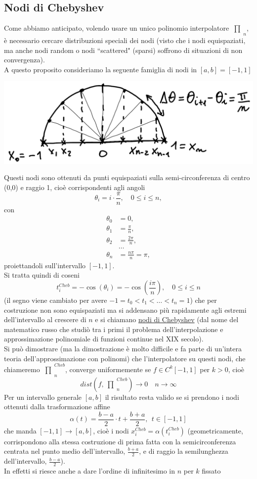\documentclass[12pt]{article}
\newcommand{\inter}{\begin{matrix}\prod\end{matrix}}
\begin{document}
\subsection{Nodi di Chebyshev}
Come abbiamo anticipato, volendo usare un unico polinomio interpolatore $\inter_n$, è necessario cercare distribuzioni speciali dei nodi (visto che i nodi equispaziati, ma anche nodi random o nodi ``scattered" (sparsi) soffrono di situazioni di non convergenza).\\
A questo proposito consideriamo la seguente famiglia di nodi in $[a,b]=[-1,1]$
\begin{center}
    \includegraphics[scale=0.5]{pag-16.png}
\end{center}
Questi nodi sono ottenuti da punti equispaziati sulla semi-circonferenza di centro (0,0) e raggio 1, cioè corrispondenti agli angoli 
\[\theta_i=i\cdot \frac{\pi}{n}, \quad 0\leq i\leq n,\] 
con 
\[\begin{split}
    \theta_0 & = 0, \\
    \theta_1 & = \frac{\pi}{n}, \\
    \theta_2 & = \frac{2\pi}{n}, \\
    & \dotso \\
    \theta_n & = \frac{n\pi}{n}=\pi,
\end{split}\]
 proiettandoli sull'intervallo $[-1,1]$.\\ 
 Si tratta quindi di coseni 
\[ t_i^{Cheb}=-\cos(\theta_i)=-\cos\left(\frac{i\pi}{n}\right),\quad 0\leq i\leq n \]
(il segno viene cambiato per avere $-1=t_0< t_1<\dotso<t_n=1$) che per costruzione non sono equispaziati ma si addensano  più rapidamente agli estremi dell'intervallo al crescere di $n$ e si chiamano \uline{nodi di Chebyshev} (dal nome del matematico russo che studiò tra i primi il problema dell'interpolazione e approssimazione polinomiale di funzioni continue nel XIX secolo).\\ 
Si può dimostrare (ma la dimostrazione è molto difficile e fa parte di un'intera teoria dell'approssimazione con polinomi) che l'interpolatore su questi nodi, che chiameremo $\inter_n^{Cheb}$, converge uniformemente se $f\in C^k[-1,1]$ per $k>0$, cioè
\[ dist(f,\inter_n^{Cheb})\rightarrow 0 \quad n\rightarrow\infty \]
Per un intervallo generale $[a,b]$ il risultato resta valido se si prendono i nodi ottenuti dalla trasformazione affine
\[ \alpha(t)=\frac{b-a}{2}\cdot t+\frac{b+a}{2},\ \ t\in[-1,1] \]
che manda $[-1,1] \rightarrow [a,b]$, cioè i nodi $x_i^{Cheb}=\alpha(t_i^{Cheb})$ (geometricamente, corrispondono alla stessa costruzione di prima fatta con la semicirconferenza centrata nel punto medio dell'intervallo, $\frac{b+a}{2}$, e di raggio la semilunghezza dell'intervallo, $\frac{b-a}{2}$).\\
In effetti si riesce anche a dare l'ordine di infinitesimo in $n$ per $k$ fissato
\end{document}
